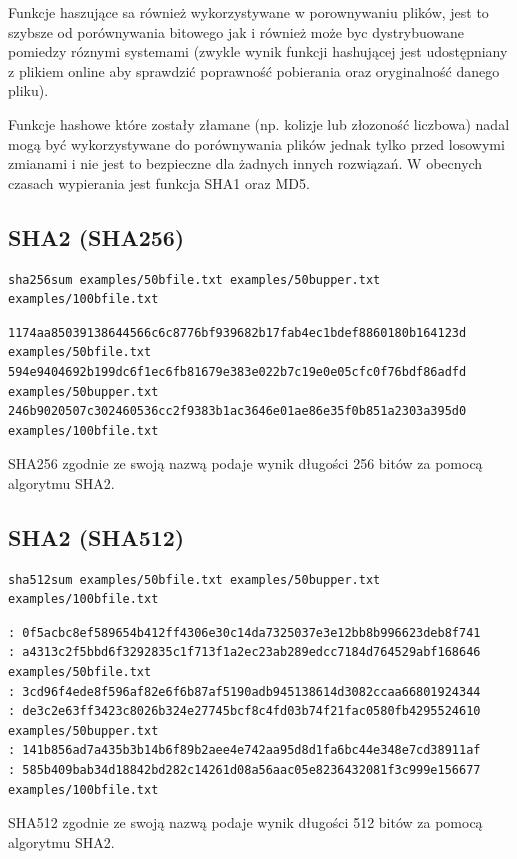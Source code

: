 \documentclass[11pt]{article}
\begin{document}
Funkcje haszujące sa również wykorzystywane w porownywaniu plików, jest to szybsze od porównywania bitowego jak i również może byc dystrybuowane pomiedzy róznymi systemami (zwykle wynik funkcji hashującej jest udostępniany z plikiem online aby sprawdzić poprawność pobierania  oraz oryginalność danego pliku).

Funkcje hashowe które zostały złamane (np. kolizje lub złozoność liczbowa) nadal mogą być wykorzystywane do porównywania plików jednak tylko przed losowymi zmianami i nie jest to bezpieczne dla żadnych innych rozwiązań. W obecnych czasach wypierania jest funkcja SHA1 oraz MD5.

\subsection{SHA2 (SHA256)}
\label{sec:org23ee42c}
\begin{verbatim}
sha256sum examples/50bfile.txt examples/50bupper.txt  examples/100bfile.txt
\end{verbatim}

\begin{verbatim}
1174aa85039138644566c6c8776bf939682b17fab4ec1bdef8860180b164123d  examples/50bfile.txt
594e9404692b199dc6f1ec6fb81679e383e022b7c19e0e05cfc0f76bdf86adfd  examples/50bupper.txt
246b9020507c302460536cc2f9383b1ac3646e01ae86e35f0b851a2303a395d0  examples/100bfile.txt
\end{verbatim}


SHA256 zgodnie ze swoją nazwą podaje wynik długości 256 bitów za pomocą algorytmu SHA2.

\subsection{SHA2 (SHA512)}
\label{sec:org8b8fd82}
\begin{verbatim}
sha512sum examples/50bfile.txt examples/50bupper.txt  examples/100bfile.txt
\end{verbatim}

\begin{verbatim}
: 0f5acbc8ef589654b412ff4306e30c14da7325037e3e12bb8b996623deb8f741
: a4313c2f5bbd6f3292835c1f713f1a2ec23ab289edcc7184d764529abf168646  examples/50bfile.txt
: 3cd96f4ede8f596af82e6f6b87af5190adb945138614d3082ccaa66801924344
: de3c2e63ff3423c8026b324e27745bcf8c4fd03b74f21fac0580fb4295524610  examples/50bupper.txt
: 141b856ad7a435b3b14b6f89b2aee4e742aa95d8d1fa6bc44e348e7cd38911af
: 585b409bab34d18842bd282c14261d08a56aac05e8236432081f3c999e156677  examples/100bfile.txt
\end{verbatim}
SHA512 zgodnie ze swoją nazwą podaje wynik długości 512 bitów za pomocą algorytmu SHA2.
\end{document}
